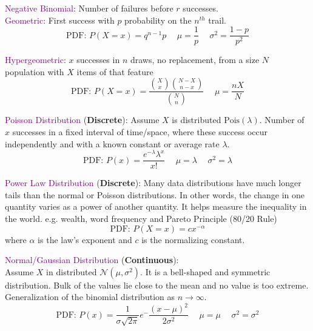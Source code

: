 \documentclass[letterpaper, 10.5pt,landscape]{article}
\begin{document}
\begin{multicols*}{3}
\vspace{3pt}

\textcolor{purple}{Negative Binomial}:  
Number of failures before $r$ successes. \\
\vspace{3pt}
\textcolor{purple}{Geometric}: 
First success with $p$ probability on the $n^{th}$ trail.
\vspace{-3pt}
\[\boxed{\text{PDF: } P(X=x) = q^{n-1}p} \hspace{15pt} \boxed{\mu = \frac{1}{p}} \hspace{15pt} \boxed{\sigma^{2} = \frac{1-p}{p^2}} \]

\textcolor{purple}{Hypergeometric}: 
$x$ successes in $n$ draws, no replacement, from a size $N$ population with $X$ items of that feature
\vspace{-3pt}
\[\boxed{\text{PDF: } P(X=x) = \frac{ \binom{X}{x} \binom{N-X}{n-x}} {{\binom{N}{n}}}} \hspace{15pt} \boxed{\mu = \frac{nX}{N}} \]







\textcolor{purple}{Poisson Distribution} (\textbf{Discrete}): Assume $X$ is distributed \(\text{Pois}(\lambda) \). Number of $x$ successes in a fixed interval of time/space, where these success occur independently and with a known constant or average rate $\lambda$.
\vspace{-3pt}
\[\boxed{\text{PDF: } P(x) = \frac{e^{-\lambda} \lambda^{x}}{x!}} \hspace{15pt}  \boxed{\mu =   \lambda} \hspace{15pt} \boxed{\sigma^{2} = \lambda }  \]


\textcolor{purple}{Power Law Distribution} (\textbf{Discrete}):
Many data distributions have much longer tails than
the normal or Poisson distributions. In other words,
the change in one quantity varies as a power of another
quantity. It helps measure the inequality in the world.
e.g. wealth, word frequency and Pareto Principle (80/20
Rule)
\vspace{-3pt}
\[\boxed{\text{PDF: } P(X=x) = cx^{-\alpha}}\]
where $\alpha$ is the law's exponent and $c$ is the normalizing constant.

\vspace{3pt}
\textcolor{purple}{Normal/Gaussian Distribution} (\textbf{Continuous}): \\
Assume $X$ in distributed $\mathcal{N}(\mu, \sigma^{2})$. It is a bell-shaped and symmetric distribution. Bulk of the values lie close to the mean and no value is too extreme. Generalization of the binomial distribution as $n \rightarrow \infty$.
\vspace{-3pt}
\[\boxed{\text{PDF: } P(x) = \frac{1}{\sigma\sqrt{2\pi}} e^-\frac{(x-\mu)^{2}}{2\sigma^{2}}} \hspace{15pt} \boxed{\mu =\mu}  \hspace{15pt}  \boxed{\sigma^{2} =  \sigma^{2}} \]



\end{multicols*}
\end{document}
